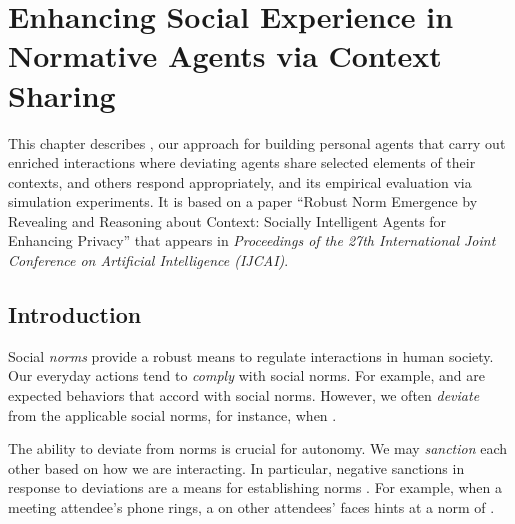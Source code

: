 \chapter[Enhancing Social Experience via Context Sharing]{Enhancing Social Experience in Normative Agents via Context Sharing}
\label{chap:poros}

This chapter describes \frameworkB, our approach for building
personal agents that carry out enriched interactions where deviating
agents share selected elements of their contexts, and others
respond appropriately, and its empirical evaluation via 
simulation experiments. It is based on a paper ``Robust Norm 
Emergence by Revealing and Reasoning about Context: Socially 
Intelligent Agents for Enhancing Privacy'' that appears in 
\emph{ Proceedings of the 27th International Joint Conference 
on Artificial Intelligence (IJCAI)}.

\section{Introduction}
\label{sec:Poros-intro}

Social \emph{norms} provide a robust means to regulate interactions in 
human society. Our everyday actions tend to \emph{comply} with social norms. For example,  and  are expected 
behaviors that accord with social norms. However,  we often \emph{deviate} from the applicable social norms, for 
instance, when .

The ability to deviate from norms is crucial for autonomy. We 
may \emph{sanction} each other based on how we
are interacting. In particular, negative sanctions in response to
deviations are a means for establishing norms \citep{Andrighetto-2013-PunishVoice}. 
For example, when a meeting attendee's phone rings, a  on other attendees'
faces hints at a norm of .

